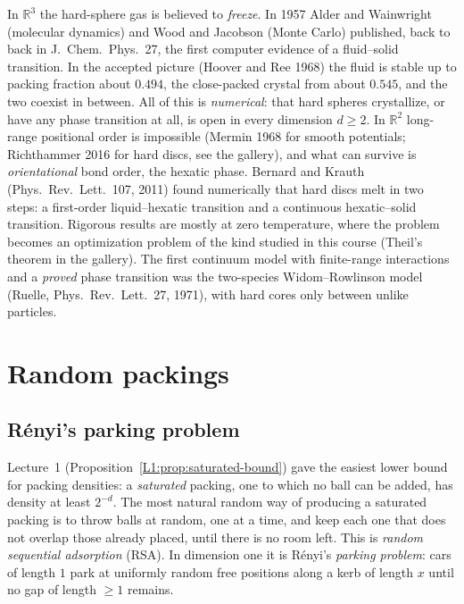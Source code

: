 \documentclass[11pt,openany]{book}
\theoremstyle{plain}
\theoremstyle{definition}
\theoremstyle{remark}
\newcommand{\R}{\mathbb{R}}
\begin{document}
In $\R^3$ the hard-sphere gas is believed to \emph{freeze}. In 1957 Alder and Wainwright (molecular
dynamics) and Wood and Jacobson (Monte Carlo) published, back to back in J.~Chem.\ Phys.~27, the
first computer evidence of a fluid--solid transition. In the accepted picture (Hoover and Ree 1968) the
fluid is stable up to packing fraction about $0.494$, the close-packed crystal from about $0.545$, and
the two coexist in between. All of this is \emph{numerical}: that hard spheres crystallize, or have any
phase transition at all, is open in every dimension $d\ge2$. In $\R^2$ long-range positional order is
impossible (Mermin 1968 for smooth potentials; Richthammer 2016 for hard discs, see the gallery), and
what can survive is \emph{orientational} bond order, the hexatic phase. Bernard and Krauth (Phys.\ Rev.\
Lett.\ 107, 2011) found numerically that hard discs melt in two steps: a first-order liquid--hexatic
transition and a continuous hexatic--solid transition. Rigorous results are mostly at zero temperature,
where the problem becomes an optimization problem of the kind studied in this course (Theil's theorem in
the gallery). The first continuum model with finite-range interactions and a \emph{proved} phase
transition was the two-species Widom--Rowlinson model (Ruelle, Phys.\ Rev.\ Lett.\ 27, 1971), with hard
cores only between unlike particles.

\section{Random packings}
\label{SM:sec:random}

\subsection{R\'enyi's parking problem}

Lecture~1 (Proposition~\ref{L1:prop:saturated-bound}) gave the easiest lower bound for packing
densities: a \emph{saturated} packing, one to which no ball can be added, has density at least
$2^{-d}$. The most natural random way of producing a saturated packing is to throw balls at random,
one at a time, and keep each one that does not overlap those already placed, until there is no room
left. This is \emph{random sequential adsorption} (RSA). In dimension one it is R\'enyi's \emph{parking
problem}: cars of length $1$ park at uniformly random free positions along a kerb of length $x$ until no
gap of length $\ge1$ remains.
\end{document}
